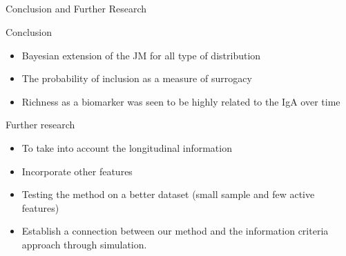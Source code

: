 \documentclass[a4paper,9pt]{beamer}
\begin{document}
\subsection{}
\begin{frame}{\huge{Conclusion and Further Research}}
\vspace{-0.2in}
\begin{block}{\huge{Conclusion}}
\end{block}
\begin{itemize}
\item Bayesian extension of the JM for all type of distribution
\item The probability of inclusion as a measure of surrogacy
\item Richness as a biomarker was seen to be \alert{highly related to the IgA over time} 
\end{itemize}

\begin{block}{\huge{Further research}}
\end{block}
\begin{itemize}
\item To take into account the \alert{longitudinal information}
\item Incorporate other features
\item Testing the method on \alert{a better dataset (small sample and few active features)}
\item  Establish a \alert{connection between our method and the information criteria approach through simulation.}
\end{itemize}

\end{frame}
\end{document}
